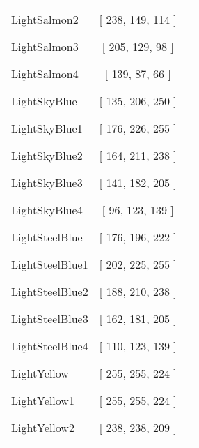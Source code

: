 \begin{tabular}{|l|c|c|}
LightSalmon2 & [ 238, 149, 114 ] & \color{LightSalmon2} \rule{1cm}{1.5ex}\\
LightSalmon3 & [ 205, 129, 98 ] & \color{LightSalmon3} \rule{1cm}{1.5ex}\\
LightSalmon4 & [ 139, 87, 66 ] & \color{LightSalmon4} \rule{1cm}{1.5ex}\\
LightSkyBlue & [ 135, 206, 250 ] & \color{LightSkyBlue} \rule{1cm}{1.5ex}\\
LightSkyBlue1 & [ 176, 226, 255 ] & \color{LightSkyBlue1} \rule{1cm}{1.5ex}\\
LightSkyBlue2 & [ 164, 211, 238 ] & \color{LightSkyBlue2} \rule{1cm}{1.5ex}\\
LightSkyBlue3 & [ 141, 182, 205 ] & \color{LightSkyBlue3} \rule{1cm}{1.5ex}\\
LightSkyBlue4 & [ 96, 123, 139 ] & \color{LightSkyBlue4} \rule{1cm}{1.5ex}\\
LightSteelBlue & [ 176, 196, 222 ] & \color{LightSteelBlue} \rule{1cm}{1.5ex}\\
LightSteelBlue1 & [ 202, 225, 255 ] & \color{LightSteelBlue1} \rule{1cm}{1.5ex}\\
LightSteelBlue2 & [ 188, 210, 238 ] & \color{LightSteelBlue2} \rule{1cm}{1.5ex}\\
LightSteelBlue3 & [ 162, 181, 205 ] & \color{LightSteelBlue3} \rule{1cm}{1.5ex}\\
LightSteelBlue4 & [ 110, 123, 139 ] & \color{LightSteelBlue4} \rule{1cm}{1.5ex}\\
LightYellow & [ 255, 255, 224 ] & \color{LightYellow} \rule{1cm}{1.5ex}\\
LightYellow1 & [ 255, 255, 224 ] & \color{LightYellow1} \rule{1cm}{1.5ex}\\
LightYellow2 & [ 238, 238, 209 ] & \color{LightYellow2} \rule{1cm}{1.5ex}\\
\end{tabular}


